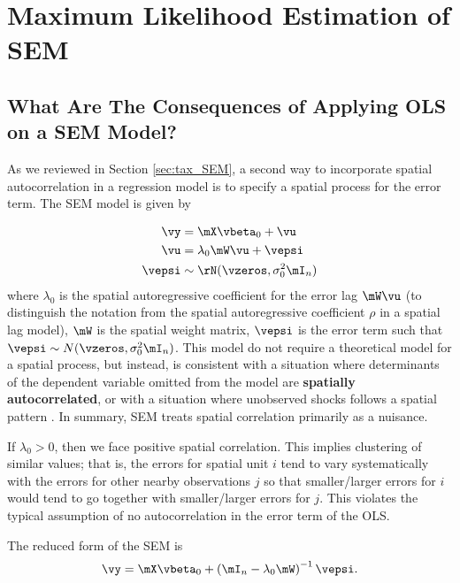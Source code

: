 \documentclass[english,12pt]{book}\usepackage[]{graphicx}\usepackage[]{xcolor}
\begin{document}
\section{Maximum Likelihood Estimation of SEM}\label{sec:sem-ml}

\subsection{What Are The Consequences of Applying OLS on a SEM Model?}

As we reviewed in Section \ref{sec:tax_SEM}, a second way to incorporate spatial autocorrelation in a regression model is to specify a spatial process for the error term.  The SEM model is given by

\begin{equation}\label{eq:sem_ml}
	\begin{aligned}
	\vy  & = \mX\vbeta_0 + \vu \\ 
	 \vu & = \lambda_0 \mW \vu + \vepsi \\
	 \vepsi & \sim \rN(\vzeros, \sigma^2_0\mI_n)
	\end{aligned}
\end{equation}
%
where $\lambda_0$ is the spatial autoregressive coefficient for the error lag $\mW\vu$ (to distinguish the notation from the spatial autoregressive coefficient $\rho$ in a spatial lag model), $\mW$ is the spatial weight matrix, $\vepsi$ is the error term such that $\vepsi \sim N(\vzeros, \sigma^2_0\mI_n)$. This model do not require a theoretical model for a spatial process, but instead, is consistent with a situation where determinants of the dependent variable omitted from the model are \textbf{spatially autocorrelated}, or with a situation where unobserved shocks follows a spatial pattern \citep{elhorst2014spatial}. In summary, SEM treats spatial correlation primarily as a nuisance. 

If $\lambda_0 > 0$, then we face positive spatial correlation. This implies clustering of similar values; that is, the errors for spatial unit $i$ tend to vary systematically with the errors for other nearby observations $j$ so that smaller/larger errors for $i$ would tend to go together with smaller/larger errors for $j$. This violates the typical assumption of no autocorrelation in the error term of the OLS. 

The reduced form of the SEM is
\begin{equation*}
	\vy = \mX\vbeta_0 + \left(\mI_n-\lambda_0\mW\right)^{-1}\vepsi.
\end{equation*}
\end{document}
